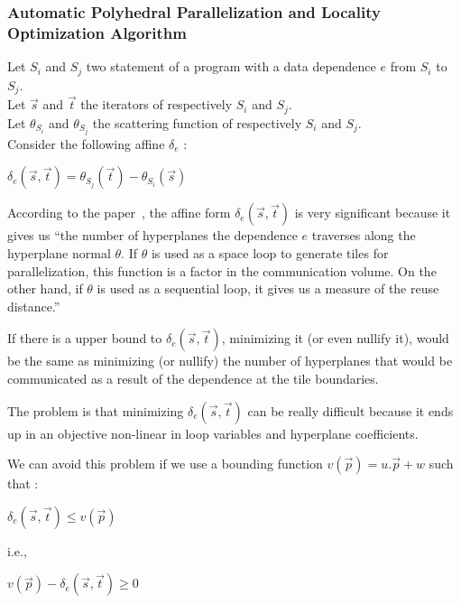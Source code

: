 \documentclass[paper=a4, fontsize=11pt]{scrartcl}
\numberwithin{equation}{section}        %
\numberwithin{figure}{section}          %
\numberwithin{table}{section}               %
\begin{document}
            
        \subsubsection{Automatic Polyhedral Parallelization and Locality Optimization Algorithm}
            Let $S_i$ and $S_j$ two statement of a program with a data dependence $e$
            from $S_i$ to $S_j$.\\
            Let $\vec{s}$ and $\vec{t}$ the iterators of respectively $S_i$ and $S_j$.\\
            Let $\theta_{S_i}$ and $\theta_{S_j}$ the scattering function of respectively $S_i$
            and $S_j$.\\
            Consider the following affine $\delta_e$ :
            \begin{center}
                $\delta_e\left(\vec{s},\vec{t}\right) = \theta_{S_j}\left(\vec{t}\right) - \theta_{S_i}\left(\vec{s}\right)$
            \end{center}

            According to the paper~\cite{Bondhugula:2008:PAP:1379022.1375595},
            the affine form $\delta_e\left(\vec{s},\vec{t}\right)$ is very significant
            because it gives us ``the number of hyperplanes the dependence $e$ traverses
            along the hyperplane normal $\theta$. If $\theta$ is used as a space loop to generate tiles
            for parallelization, this function is a factor in the communication
            volume. On the other hand, if $\theta$ is used as a sequential loop, it
            gives us a measure of the reuse distance.''

            If there is a upper bound to $\delta_e\left(\vec{s},\vec{t}\right)$,
            minimizing it (or even nullify it), would be the same as minimizing (or nullify)
            the number of hyperplanes that would be communicated as a result of
            the dependence at the tile boundaries.

            The problem is that minimizing $\delta_e\left(\vec{s},\vec{t}\right)$
            can be really difficult because it ends up in an objective non-linear
            in loop variables and hyperplane coefficients.

            We can avoid this problem if we use a bounding function $v(\vec{p}) = u.\vec{p} + w$ such that :
            \begin{center}
                $\delta_e\left(\vec{s},\vec{t}\right) \leq v(\vec{p})$
            \end{center}
            i.e.,
            \begin{center}
                $v(\vec{p}) - \delta_e\left(\vec{s},\vec{t}\right) \geq 0$
            \end{center}
\end{document}
